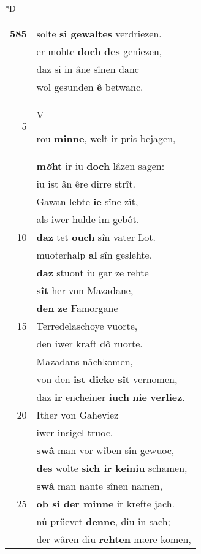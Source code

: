 \documentclass[8pt,a4paper,notitlepage]{article}
\begin{document}
\begin{table}[ht]
\begin{minipage}[t]{0.5\linewidth}
\small
\begin{center}*D
\end{center}
\begin{tabular}{rl}
\textbf{585} & solte \textbf{si gewaltes} verdriezen.\\ 
 & er mohte \textbf{doch} \textbf{des} geniezen,\\ 
 & daz si in âne sînen danc\\ 
 & wol gesunden \textbf{ê} betwanc.\\ 
5 & \begin{large}V\end{large}rou \textbf{minne}, welt ir prîs bejagen,\\ 
 & \textbf{m\textit{ö}ht} ir iu \textbf{doch} lâzen sagen:\\ 
 & iu ist ân êre dirre strît.\\ 
 & Gawan lebte \textbf{ie} sîne zît,\\ 
 & als iwer hulde im gebôt.\\ 
10 & \textbf{daz} tet \textbf{ouch} sîn vater Lot.\\ 
 & muoterhalp \textbf{al} sîn geslehte,\\ 
 & \textbf{daz} stuont iu gar ze rehte\\ 
 & \textbf{sît} her von Mazadane,\\ 
 & \textbf{den} \textbf{ze} Famorgane\\ 
15 & Terredelaschoye vuorte,\\ 
 & den iwer kraft dô ruorte.\\ 
 & Mazadans nâchkomen,\\ 
 & von den \textbf{ist dicke sît} vernomen,\\ 
 & daz \textbf{ir} encheiner \textbf{iuch} \textbf{nie} \textbf{verliez}.\\ 
20 & Ither von Gaheviez\\ 
 & iwer insigel truoc.\\ 
 & \textbf{swâ} man vor wîben sîn gewuoc,\\ 
 & \textbf{des} wolte \textbf{sich ir keiniu} schamen,\\ 
 & \textbf{swâ} man nante sînen namen,\\ 
25 & \textbf{ob si der minne} ir krefte jach.\\ 
 & nû prüevet \textbf{denne}, diu in sach;\\ 
 & der wâren diu \textbf{rehten} mære komen,\\ 

\end{tabular}
\end{minipage}
\end{table}
\end{document}
